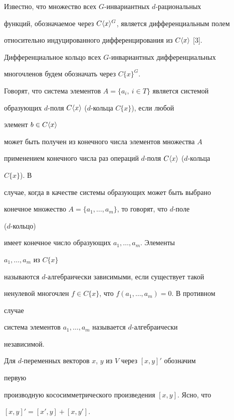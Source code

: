 Известно, что множество всех $G$-инвариантных $d$-рациональных 


функций, обозначаемое через $C\langle x\rangle^G$, является дифференциальным полем 


относительно индуцированного дифференцирования из $C\langle x\rangle$ [3].





Дифференциальное кольцо всех $G$-инвариантных дифференциальных 


многочленов будем обозначать через $C\{x\}^G$.





Говорят, что система элементов $A=\{a_i,\ i\in T\}$ является системой


образующих $d$-поля $C\langle x\rangle$ ($d$-кольца $C\{x\}$), если любой 


элемент $b\in C\langle x\rangle$


может быть получен из конечного числа элементов множества $A$ 


применением конечного числа раз операций $d$-поля $C\langle x\rangle$ ($d$-кольца 


$C\{x\}$). В 


случае, когда в качестве системы образующих может быть выбрано 


конечное множество $A=\{a_1,\dotsc,a_m\}$, то говорят, что $d$-поле 


($d$-кольцо)


имеет конечное число образующих $a_1,\dotsc,a_m$. Элементы 


$a_1,\dotsc,a_m$ из $C\{x\}$


называются $d$-алгебраически зависимыми, если существует такой 


ненулевой многочлен $f\in C\{x\}$, что $f(a_1,\dotsc,a_m)=0$. В противном 


случае


система элементов $a_1,\dotsc,a_m$ называется $d$-алгебраически 


независимой.





Для $d$-переменных векторов $x$, $y$ из $V$ через $[x,y]'$ обозначим 


первую 


производную кососимметрического произведения $[x,y]$. Ясно, что 


$[x,y]'=[x',y]+[x,y']$.






